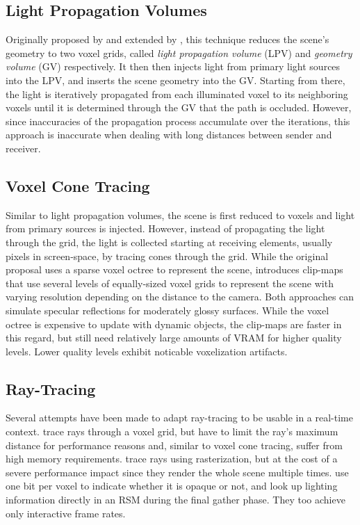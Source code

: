 \subsection{Light Propagation Volumes}

Originally proposed by \citet{Kaplanyan:2010:LPV} and extended by \citet{Kaplanyan:2010:LPV2}, this technique reduces the scene's geometry to two voxel grids, called \emph{light propagation volume} (LPV) and \emph{geometry volume} (GV) respectively. It then then injects light from primary light sources into the LPV, and inserts the scene geometry into the GV. Starting from there, the light is iteratively propagated from each illuminated voxel to its neighboring voxels until it is determined through the GV that the path is occluded. However, since inaccuracies of the propagation process accumulate over the iterations, this approach is inaccurate when dealing with long distances between sender and receiver.


\subsection{Voxel Cone Tracing}

Similar to light propagation volumes, the scene is first reduced to voxels and light from primary sources is injected. However, instead of propagating the light through the grid, the light is collected starting at receiving elements, usually pixels in screen-space, by tracing cones through the grid.
While the original proposal \citep{Crassin:2012:OctreeVCT} uses a sparse voxel octree to represent the scene, \citet{Panteleev:2015:VXGI} introduces clip-maps that use several levels of equally-sized voxel grids to represent the scene with varying resolution depending on the distance to the camera.
Both approaches can simulate specular reflections for moderately glossy surfaces. While the voxel octree is expensive to update with dynamic objects, the clip-maps are faster in this regard, but still need relatively large amounts of VRAM for higher quality levels. Lower quality levels exhibit noticable voxelization artifacts.


\subsection{Ray-Tracing}

Several attempts have been made to adapt ray-tracing to be usable in a real-time context.
\citet{Thiedemann:2011:VGI} trace rays through a voxel grid, but have to limit the ray's maximum distance for performance reasons and, similar to voxel cone tracing, suffer from high memory requirements.
\citet{Tokuyoshi:2012:pathtracingrasterization} trace rays using rasterization, but at the cost of a severe performance impact since they render the whole scene multiple times.
\citet{Chen:2016:Compactvoxels} use one bit per voxel to indicate whether it is opaque or not, and look up lighting information directly in an RSM during the final gather phase. They too achieve only interactive frame rates.


